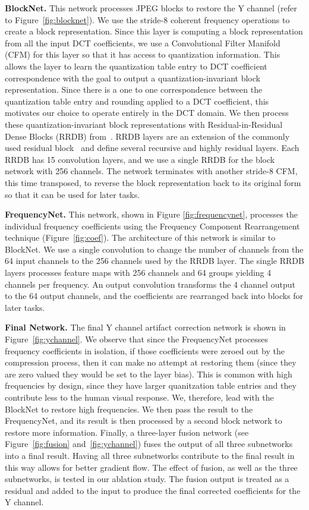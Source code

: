 \documentclass[runningheads]{llncs}
\begin{document}
\noindent\textbf{BlockNet.} This network processes JPEG blocks to restore the Y channel (refer to Figure~\ref{fig:blocknet}). We use
the  stride-8 coherent frequency operations to create a block representation. Since this layer is computing a block representation from all the
input DCT coefficients, we use a Convolutional Filter Manifold (CFM) for this layer
so that it has access to quantization information. This allows the layer to learn the quantization table entry to DCT coefficient correspondence with the goal to output a quantization-invariant block representation. Since there is a one to one correspondence between the quantization table entry and rounding applied to a DCT coefficient, this motivates our choice to operate entirely in the DCT domain. We then process these quantization-invariant block representations with Residual-in-Residual Dense Blocks (RRDB) from~\cite{wang2018esrgan}. RRDB layers are an extension of the commonly used residual block~\cite{he2016deep} and define several recursive and highly residual layers. Each RRDB has 15 convolution layers, and we use a single RRDB for the block network with 256 channels. The network terminates with another 
 stride-8 CFM, this time transposed, to reverse the block representation back to its original form so that it can be used for later tasks. 


\noindent\textbf{FrequencyNet.} This network, shown in Figure \ref{fig:frequencynet}, processes the individual frequency coefficients using the Frequency Component Rearrangement technique (Figure~\ref{fig:coef}). The architecture of this network is similar to BlockNet. We use a single  convolution to change the number of channels from the 64 input channels to the 256 channels used by the RRDB layer. The single RRDB layers processes feature maps with 256 channels and 64 groups yielding 4 channels per frequency. An output  convolution transforms the 4 channel output to the 64 output channels, and the coefficients are rearranged back into blocks for later tasks.

\noindent\textbf{Final Network.}
The final Y channel artifact correction network is shown in Figure~\ref{fig:ychannel}. We observe that since the FrequencyNet processes frequency coefficients in isolation, if those coefficients were zeroed out by the compression 
process, then it can make no attempt at restoring them (since they are zero valued they would be set to the layer bias). This is common with high frequencies by design, since they have larger quanitzation table entries and they contribute less to the human visual response. We, therefore, lead with the BlockNet to restore high frequencies. We then pass the result to the FrequencyNet, and its result is then processed by a second block network to restore more information. Finally, a three-layer fusion network (see Figure~\ref{fig:fusion} and~\ref{fig:ychannel}) fuses the output of all three subnetworks into a final result. Having all three subnetworks contribute to the final result in this way allows for better gradient flow. The effect of fusion, as well as the three subnetworks, is tested in our ablation study. The fusion output is treated as a residual and added to the input to produce the final corrected coefficients for the Y channel.
\end{document}
